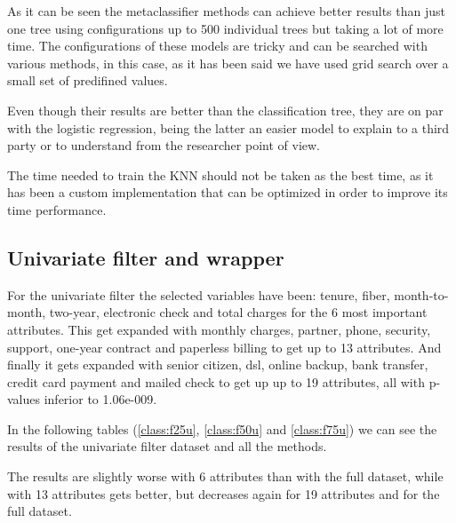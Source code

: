 \documentclass[a4paper,11pt]{article}
\begin{document}
As it can be seen the metaclassifier methods can achieve better results than just one tree using configurations up to 500 individual trees but taking a lot of more time. The configurations of these models are tricky and can be searched with various methods, in this case, as it has been said we have used grid search over a small set of predifined values.

Even though their results are better than the classification tree, they are on par with the logistic regression, being the latter an easier model to explain to a third party or to understand from the researcher point of view.

The time needed to train the KNN should not be taken as the best time, as it has been a custom implementation that can be optimized in order to improve its time performance.

\subsection{Univariate filter and wrapper}

For the univariate filter the selected variables have been: tenure, fiber, month-to-month, two-year, electronic check and total charges for the 6 most important attributes. This get expanded with monthly charges, partner, phone, security, support, one-year contract and paperless billing to get up to 13 attributes. And finally it gets expanded with senior citizen, dsl, online backup, bank transfer, credit card payment and mailed check to get up up to 19 attributes, all with p-values inferior to 1.06e-009.

In the following tables (\ref{class:f25u}, \ref{class:f50u} and \ref{class:f75u}) we can see the results of the univariate filter dataset and all the methods.

The results are slightly worse with 6 attributes than with the full dataset, while with 13 attributes gets better, but decreases again for 19 attributes and for the full dataset.
\end{document}
